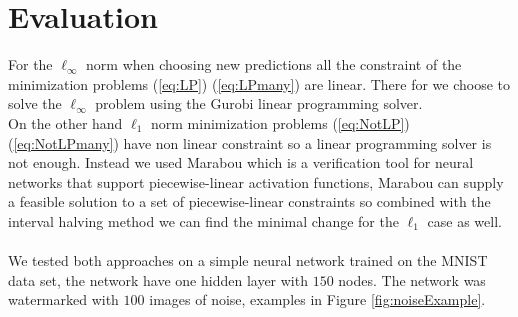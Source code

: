 \documentclass[a4paper]{easychair}
\newcommand{\guy}[1]{\marginpar{\textcolor{orange}{Guy: #1}}}
\begin{document}
\guy{Overall, this looks good. Some stuff will need to be moved to other
sections according to the paper layout.}

\section{Evaluation}
\label{sec:evaluation}
For the $\ell_\infty$ norm when choosing new predictions all the constraint of the minimization problems (\ref{eq:LP}) (\ref{eq:LPmany}) are linear. There for we choose to solve the $\ell_\infty$ problem using the Gurobi linear programming solver.
\\
On the other hand $\ell_1$ norm minimization problems (\ref{eq:NotLP}) (\ref{eq:NotLPmany}) have non linear constraint so a linear programming solver is not enough. Instead we used Marabou which is a verification tool for neural networks that support piecewise-linear activation functions, Marabou can supply a feasible solution to a set of piecewise-linear constraints so combined with the interval halving method we can find the minimal change for the $\ell_1$ case as well. 
\\\\
We tested both approaches on a simple neural network trained on the MNIST data set, the network have one hidden layer with $150$ nodes. The network was watermarked with $100$ images of noise, examples in Figure \ref{fig:noiseExample}.
\end{document}
